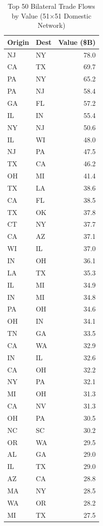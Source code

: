 \documentclass[12pt,oneside]{book}
\begin{document}
\begin{table}[ht]
\centering
\footnotesize
\caption{Top 50 Bilateral Trade Flows by Value (51$\times$51 Domestic Network)}
\label{tab:top_edges}
\begin{tabular}{llr}
\hline
\textbf{Origin} & \textbf{Dest} & \textbf{Value (\$B)} \\
\hline
NJ & NY & 78.0 \\
CA & TX & 69.7 \\
PA & NY & 65.2 \\
PA & NJ & 58.4 \\
GA & FL & 57.2 \\
IL & IN & 55.4 \\
NY & NJ & 50.6 \\
IL & WI & 48.0 \\
NJ & PA & 47.5 \\
TX & CA & 46.2 \\
OH & MI & 41.4 \\
TX & LA & 38.6 \\
CA & FL & 38.5 \\
TX & OK & 37.8 \\
CT & NY & 37.7 \\
CA & AZ & 37.1 \\
WI & IL & 37.0 \\
IN & OH & 36.1 \\
LA & TX & 35.3 \\
IL & MI & 34.9 \\
IN & MI & 34.8 \\
PA & OH & 34.6 \\
OH & IN & 34.1 \\
TN & GA & 33.5 \\
CA & WA & 32.9 \\
IN & IL & 32.6 \\
CA & OH & 32.2 \\
NY & PA & 32.1 \\
MI & OH & 31.3 \\
CA & NV & 31.3 \\
OH & PA & 30.5 \\
NC & SC & 30.2 \\
OR & WA & 29.5 \\
AL & GA & 29.0 \\
IL & TX & 29.0 \\
AZ & CA & 28.8 \\
MA & NY & 28.5 \\
WA & OR & 28.2 \\
MI & TX & 27.5 \\

\end{tabular}
\end{table}
\end{document}
